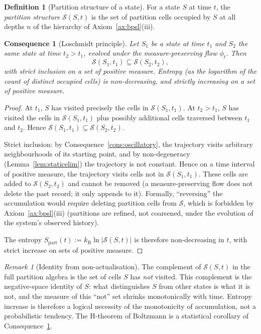 \documentclass[11pt,twocolumn,a4paper]{article}
\theoremstyle{axiomstyle}
\theoremstyle{conseqstyle}
\newtheorem{consequence}{Consequence}
\theoremstyle{definition}
\newtheorem{definition}{Definition}
\theoremstyle{remark}
\newtheorem*{remark}{Remark}
\newcommand{\kB}{k_{\mathrm{B}}}
\newcommand{\Sspace}{\mathcal{S}}
\begin{document}
\begin{definition}[Partition structure of a state]
\label{def:partstruct}
For a state $S$ at time $t$, the \emph{partition structure} $\Sspace(S,t)$ is the set of partition cells occupied by $S$ at all depths $n$ of the hierarchy of Axiom~\ref{ax:bpsl}(iii).
\end{definition}

\begin{consequence}[Loschmidt principle]
\label{cons:loschmidt}
Let $S_{1}$ be a state at time $t_{1}$ and $S_{2}$ the same state at time $t_{2}>t_{1}$, evolved under the measure-preserving flow $\phi_{t}$. Then
\begin{equation}
\Sspace(S_{1},t_{1})\subseteq\Sspace(S_{2},t_{2}),
\label{eq:loschmidt}
\end{equation}
with strict inclusion on a set of positive measure. Entropy (as the logarithm of the count of distinct occupied cells) is non-decreasing, and strictly increasing on a set of positive measure.
\end{consequence}

\begin{proof}
At $t_{1}$, $S$ has visited precisely the cells in $\Sspace(S_{1},t_{1})$. At $t_{2}>t_{1}$, $S$ has visited the cells in $\Sspace(S_{1},t_{1})$ plus possibly additional cells traversed between $t_{1}$ and $t_{2}$. Hence $\Sspace(S_{1},t_{1})\subseteq\Sspace(S_{2},t_{2})$.

Strict inclusion: by Consequence~\ref{cons:oscillatory}, the trajectory visits arbitrary neighbourhoods of its starting point, and by non-degeneracy (Lemma~\ref{lem:staticelim}) the trajectory is not constant. Hence on a time interval of positive measure, the trajectory visits cells not in $\Sspace(S_{1},t_{1})$. These cells are added to $\Sspace(S_{2},t_{2})$ and cannot be removed (a measure-preserving flow does not delete the past record; it only appends to it). Formally, ``reversing'' the accumulation would require deleting partition cells from $\Sspace$, which is forbidden by Axiom~\ref{ax:bpsl}(iii) (partitions are refined, not coarsened, under the evolution of the system's observed history).

The entropy $S_{\mathrm{part}}(t):=\kB\ln|\Sspace(S,t)|$ is therefore non-decreasing in $t$, with strict increase on sets of positive measure.
\end{proof}

\begin{remark}[Identity from non-actualisation]
The complement of $\Sspace(S,t)$ in the full partition algebra is the set of cells $S$ has \emph{not} visited. This complement is the negative-space identity of $S$: what distinguishes $S$ from other states is what it is not, and the measure of this ``not'' set shrinks monotonically with time. Entropy increase is therefore a logical necessity of the monotonicity of accumulation, not a probabilistic tendency. The H-theorem of Boltzmann \citep{boltzmann1877} is a statistical corollary of Consequence~\ref{cons:loschmidt}.
\end{remark}
\end{document}
